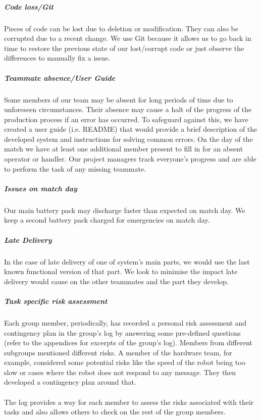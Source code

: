 \subparagraph{Code loss/Git}
Pieces of code can be lost due to deletion or modification. They can also be corrupted due to a recent change. We use Git because it allows us to go back in time to restore the previous state of our lost/corrupt code or just observe the differences to manually fix a issue.

\subparagraph{Teammate absence/User Guide}
Some members of our team may be absent for long periods of time due to unforeseen circumstances. Their absence may cause a halt of the progress of the production process if an error has occurred. To safeguard against this, we have created a user guide (i.e. README) that would provide a brief description of the developed system and  instructions for solving common errors. On the day of the match we have at least one additional member present to fill in for an absent operator or handler.  Our project managers track everyone's progress and are able to perform the task of any missing teammate. 

\subparagraph{Issues on match day}
Our main battery pack may discharge faster than expected on match day. We keep a second battery pack charged for emergencies on match day.

\subparagraph{Late Delivery}
In the case of late delivery of one of system's main parts, we would use the last known functional version of that part. We look to minimise the impact late delivery would cause on the other teammates and the part they develop.

\subparagraph{Task specific risk assessment}
Each group member, periodically, has recorded a personal risk assessment and contingency plan in the group's log by answering some pre-defined questions (refer to the appendices for excerpts of the group's log). Members from different subgroups mentioned different risks. A member of the hardware team, for example,   considered some potential risks like the speed of the robot being too slow or cases where the robot does not respond to any message. They then developed a contingency plan around that. 
\\ \\ The log provides a way for each member to assess the risks associated with their tasks and also allows others to check on the rest of the group members.

\iffalse
key is hidden in safe place
have 2 code repos we have run - fred and craig's robot
what to do in budget inefficiency?
how to test if pitch is full?
IDEAS
Where should staff meet in the event the building is not accessible?
Who has the authority to close the business in the event of an emergency?
Which staff members are critical and must be on-site or always reachable?
Where are the back-ups and how are they restored?
Who can cover for each critical staff member?
Who are single points of failure and how can those risks be ameliorated?
What systems, vendors, and partners pose risk should they fail?
Who is responsible for communicating with customers, and how?
\fi